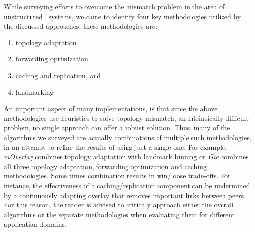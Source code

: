 %
%
%

While surveying efforts to overcome the mismatch problem
in the area of unstructured \p\ systems,
we came to identify four key methodologies 
utilized by the discussed approaches; these methodologies are:
\begin{enumerate}
  \item topology adaptation
  \item forwarding optimization
  \item caching and replication, and
  \item landmarking
\end{enumerate}
An important aspect of many implementations, is that since the above
methodologies use heuristics to solve topology mismatch, an
intrinsically difficult problem, no single approach can offer a robust solution.
Thus, many of the algorithms we surveyed are actually combinations of multiple
such methodologies, in an attempt to refine the results of using just a single one.
For example, \emph{mOverlay} combines topology adaptation with landmark binning or \emph{Gia}
combines all three topology adaptation, forwarding optimization and caching
methodologies. Some times combination results in win/loose trade-offs. For
instance, the effectiveness of a caching/replication component can be undermined
by a continuously adapting overlay that removes important links between peers.
For this reason, the reader is advised to criticaly approach either the overall
algorithms or the separate methodologies when evaluating them for different
application domains.

